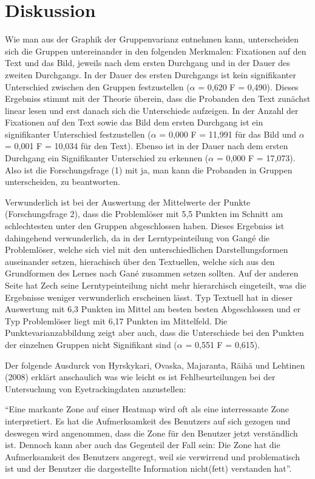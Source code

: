 \chapter{Diskussion}

Wie man aus der Graphik der Gruppenvarianz entnehmen kann, unterscheiden sich die Gruppen untereinander in den folgenden Merkmalen: Fixationen auf den Text und das Bild, jeweils nach dem ersten Durchgang und in der Dauer des zweiten Durchgangs. In der Dauer des ersten Durchgangs ist kein signifikanter Unterschied zwischen den Gruppen festzustellen ($\alpha$ = 0,620 F = 0,490). Dieses Ergebniss stimmt mit der Theorie überein, dass die Probanden den Text zunächst linear lesen und erst danach sich die Unterschiede aufzeigen. In der Anzahl der Fixationen auf den Text sowie das Bild dem ersten Durchgang ist ein signifikanter Unterschied festzustellen ($\alpha$ = 0,000 F = 11,991 für das Bild und $\alpha$ = 0,001 F = 10,034 für den Text). Ebenso ist in der Dauer nach dem ersten Durchgang ein Signifikanter Unterschied zu erkennen ($\alpha$ = 0,000 F = 17,073). Also ist die Forschungsfrage (1) mit ja, man kann die Probanden in Gruppen unterscheiden, zu beantworten.

Verwunderlich ist bei der Auswertung der Mittelwerte der Punkte (Forschungsfrage 2), dass die Problemlöser mit 5,5 Punkten im Schnitt am schlechtesten unter den Gruppen abgeschlossen haben. Dieses Ergebniss ist dahingehend verwunderlich, da in der Lerntypeinteilung von Gangé die Problemlöser, welche sich viel mit den unterschiedlichen Darstellungsformen auseinander setzen, hierachisch über den Textuellen, welche sich aus den Grundformen des Lernes nach Gané zusammen setzen sollten. Auf der anderen Seite hat Zech seine Lerntypeinteilung nicht mehr hierarchisch eingeteilt, was die Ergebnisse weniger verwunderlich erscheinen lässt. Typ Textuell hat in dieser Auswertung mit 6,3 Punkten im Mittel am besten besten Abgeschlossen und er Typ Problemlöser liegt mit 6,17 Punkten im Mittelfeld. Die Punktevarianzabbildung zeigt aber auch, dass die Unterschiede bei den Punkten der einzelnen Gruppen nicht Signifikant sind ($\alpha$ = 0,551 F = 0,615). 

Der folgende Ausdurck von Hyrskykari, Ovaska, Majaranta, Räihä und Lehtinen (2008) erklärt anschaulich was wie leicht es ist Fehlbeurteilungen bei der Untersuchung von Eyetrackingdaten anzustellen:

``Eine markante Zone auf einer Heatmap wird oft als eine interressante Zone interpretiert. Es hat die Aufmerksamkeit des Benutzers auf sich gezogen und deswegen wird angenommen, dass die Zone für den Benutzer jetzt verständlich ist. Dennoch kann aber auch das Gegenteil der Fall sein: Die Zone hat die Aufmerksamkeit des Benutzers angeregt, weil sie verwirrend und problematisch ist und der Benutzer die dargestellte Information nicht(fett) verstanden hat''\cite{hyrskykari2008gaze}.


